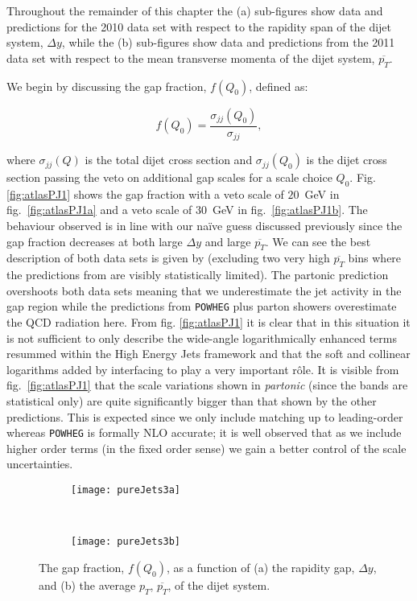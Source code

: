 	Throughout the remainder of this chapter the (a) sub-figures show data and
	predictions for the 2010 data set with respect to the rapidity span of the dijet
	system, $\Delta y$, while the (b) sub-figures show data and
	predictions from the 2011 data set with respect to the mean transverse momenta
	of the dijet system, $\overline{p_T}$.

	We begin by discussing the gap fraction, $f(Q_0)$, defined as:

	\begin{equation}
		f(Q_0) = \frac{\sigma_{jj}(Q_0)}{\sigma_{jj}},
	\end{equation}

	where $\sigma_{jj}(Q)$ is the total dijet cross section and $\sigma_{jj}(Q_0)$ is the dijet
	cross section passing the veto on additional gap scales for a scale choice $Q_0$.  Fig.
	\eqref{fig:atlasPJ1} shows the gap fraction with a veto scale of $20$~GeV in
	fig.~\eqref{fig:atlasPJ1a} and a veto scale of $30$~GeV in fig.~\eqref{fig:atlasPJ1b}.
	The behaviour observed is in line with our na\"ive guess discussed previously since the
	gap fraction decreases at both large $\Delta y$ and large $\overline{p_T}$.  We can see the
	best description of both data sets is given by \HEJA (excluding two very high $\overline{p_T}$
	bins where the predictions from \HEJA are visibly statistically limited). The partonic \HEJ
	prediction overshoots both data sets meaning that we underestimate the jet activity in the
	gap region while the predictions from \texttt{POWHEG} plus parton showers overestimate the
	QCD radiation here.  From fig. \eqref{fig:atlasPJ1} it is clear that in this situation it
	is not sufficient to only describe the wide-angle logarithmically enhanced terms resummed
	within the High Energy Jets framework and that the soft and collinear logarithms added by
	interfacing to \ARIADNE play a very important r\^ole.  It is visible from fig.~\eqref{fig:atlasPJ1}
	that the scale variations shown in \emph{partonic} \HEJ (since the \HEJA bands are statistical
	only) are quite significantly bigger than that shown by the other predictions.  This is
	expected since we only include matching up to leading-order whereas \texttt{POWHEG} is
	formally NLO accurate; it is well observed that as we include higher order terms (in the
	fixed order sense) we gain a better control of the scale uncertainties.

	\begin{figure}[bth]
		\centering
		\begin{subfigure}[b]{0.48\textwidth}
			\texttt{[image: pureJets3a]}
			\caption{}
			\label{fig:atlasPJ1a}
		\end{subfigure}
		~
		\begin{subfigure}[b]{0.48\textwidth}
			\texttt{[image: pureJets3b]}
			\caption{}
			\label{fig:atlasPJ1b}
		\end{subfigure}
		\caption{The gap fraction, $f(Q_0)$, as a function of (a) the rapidity gap,
		$\Delta y$, and (b) the average $p_T$, $\overline{p_T}$, of the dijet system.}
		\label{fig:atlasPJ1}
	\end{figure}

